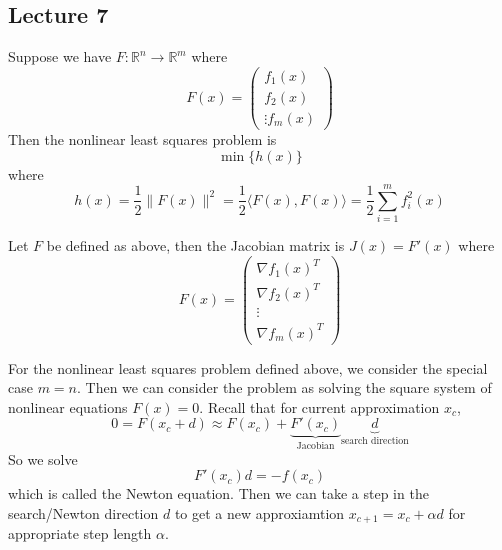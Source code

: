 \subsection{Lecture 7}
\begin{definition}
  Suppose we have $F: \mathbb R^n \to \mathbb R^m$ where $$F(x) = \begin{pmatrix}
    f_1(x) \\ f_2(x) \\ \vdots f_m(x)
  \end{pmatrix}$$ Then the nonlinear least squares problem is $$\min \{h(x)\}$$ where $$h(x) = \frac{1}{2} \|F(x)\|^2 = \frac{1}{2}\langle F(x), F(x) \rangle = \frac{1}{2} \sum^m_{i=1} f_i^2(x)$$
\end{definition}
\begin{definition}
  Let $F$ be defined as above, then the Jacobian matrix is $J(x) = F'(x)$ where $$F(x) = \begin{pmatrix}
    \nabla f_1(x)^T \\ \nabla f_2(x)^T \\ \vdots \\ \nabla f_m(x)^T
  \end{pmatrix}$$
\end{definition}
\begin{problem}
  For the nonlinear least squares problem defined above, we consider the special case $m = n$. Then we can consider the problem as solving the square system of nonlinear equations $F(x) = 0$. Recall that for current approximation $x_c$, $$0 = F(x_c + d) \approx F(x_c) + \underbrace{F'(x_c)}_{\text{Jacobian}}\underbrace{d}_{\text{search direction}}$$ So we solve $$F'(x_c)d = -f(x_c)$$ which is called the Newton equation. Then we can take a step in the search/Newton direction $d$ to get a new approxiamtion $x_{c+1} = x_c + \alpha d$ for appropriate step length $\alpha$.
\end{problem}